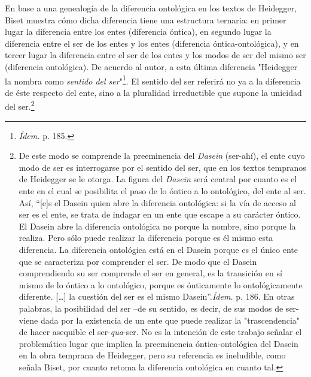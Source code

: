 \documentclass{book}
\begin{document}
En base a una genealogía de la diferencia ontológica en los textos de
Heidegger, Biset muestra cómo dicha diferencia tiene una estructura
ternaria: en primer lugar la diferencia entre los entes (diferencia
óntica), en segundo lugar la diferencia entre el ser de los entes y los
entes (diferencia óntica-ontológica), y en tercer lugar la diferencia
entre el ser de los entes y los modos de ser del mismo ser (diferencia
ontológica). De acuerdo al autor, a esta última diferencia "Heidegger la
nombra como \emph{sentido del ser}"\footnote{\emph{Ídem.} p. 185.}. El
sentido del ser referirá no ya a la diferencia de éste respecto del
ente, sino a la pluralidad irreductible que supone la unicidad del
ser.\footnote{De este modo se comprende la preeminencia del
  \emph{Dasein} (ser-ahí), el ente cuyo modo de ser es interrogarse por
  el sentido del ser, que en los textos tempranos de Heidegger se le
  otorga. La figura del \emph{Dasein} será central por cuanto es el ente
  en el cual se posibilita el paso de lo óntico a lo ontológico, del
  ente al ser. Así, ``{[}e{]}s el Dasein quien abre la diferencia
  ontológica: si la vía de acceso al ser es el ente, se trata de indagar
  en un ente que escape a su carácter óntico. El Dasein abre la
  diferencia ontológica no porque la nombre, sino porque la realiza.
  Pero sólo puede realizar la diferencia porque es él mismo esta
  diferencia. La diferencia ontológica está en el Dasein porque es el
  único ente que se caracteriza por comprender el ser. De modo que el
  Dasein comprendiendo su ser comprende el ser en general, es la
  transición en sí mismo de lo óntico a lo ontológico, porque es
  ónticamente lo ontológicamente diferente. {[}\ldots{]} la cuestión del
  ser es el mismo Dasein''.\emph{Ídem.} p. 186. En otras palabras, la
  posibilidad del ser --de su sentido, es decir, de sus modos de ser-
  viene dada por la existencia de un ente que puede realizar la
  "trascendencia" de hacer asequible el ser-\emph{qua}-ser. No es la
  intención de este trabajo señalar el problemático lugar que implica la
  preeminencia óntica-ontológica del Dasein en la obra temprana de
  Heidegger, pero su referencia es ineludible, como señala Biset, por
  cuanto retoma la diferencia ontológica en cuanto tal.}
\end{document}
